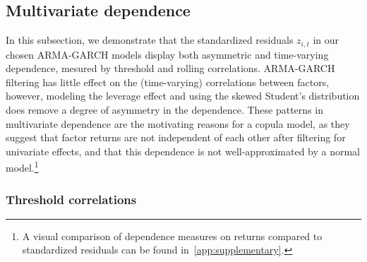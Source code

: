
\subsection{Multivariate dependence} %

In this subsection, we demonstrate that the standardized residuals $z_{i,t}$ in our chosen ARMA-GARCH models display both asymmetric and time-varying dependence, mesured by threshold and rolling correlations. ARMA-GARCH filtering has little effect on the (time-varying) correlations between factors, however, modeling the leverage effect and using the skewed Student's distribution does remove a degree of asymmetry in the dependence. These patterns in multivariate dependence are the motivating reasons for a copula model, as they suggest that factor returns are not independent of each other after filtering for univariate effects, and that this dependence is not well-approximated by a normal model.\footnote{A visual comparison of dependence measures on returns compared to standardized residuals can be found in~\autoref{app:supplementary}.}



\subsubsection{Threshold correlations}

